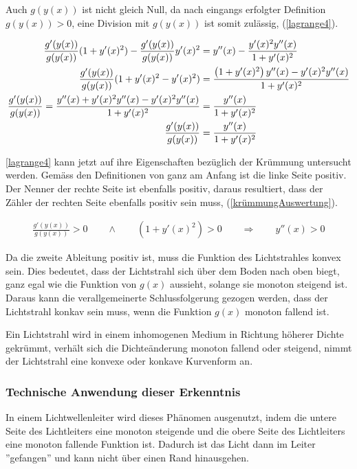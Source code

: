 Auch $g(y(x))$ ist nicht gleich Null, da nach eingangs erfolgter Definition $g(y(x)) > 0$, eine Division mit $g(y(x))$ ist somit zulässig, (\eqref{lagrange4}).

\begin{align}
	\frac{g'(y(x))}{g(y(x))} (1 + y'(x)^2) - \frac{g'(y(x))}{g(y(x))} y'(x)^2 &=  y''(x) - \frac{y'(x)^2 y''(x)}{1 + y'(x)^2} \notag \\
	\frac{g'(y(x))}{g(y(x))} (1 + y'(x)^2 - y'(x)^2) &= \frac{\left(1 + y'(x)^2 \right)y''(x) - y'(x)^2 y''(x)}{1 + y'(x)^2} \notag \\
	\frac{g'(y(x))}{g(y(x))} = \frac{y''(x) + y'(x)^2 y''(x) - y'(x)^2 y''(x)}{1 + y'(x)^2} &= \frac{y''(x)}{1 + y'(x)^2}\notag \\
	\frac{g'(y(x))}{g(y(x))} &= \frac{y''(x)}{1 + y'(x)^2}
	\label{lagrange4}
\end{align}


\eqref{lagrange4} kann jetzt auf ihre Eigenschaften bezüglich der Krümmung untersucht werden. Gemäss den Definitionen von ganz am Anfang ist die linke Seite positiv. 
Der Nenner der rechte Seite ist ebenfalls positiv, daraus resultiert, dass der Zähler der rechten Seite ebenfalls positiv sein muss, (\eqref{krümmungAuswertung}).

\begin{align}
	\frac{g'(y(x))}{g(y(x))} > 0 \qquad \wedge \qquad (1 + y'(x)^2) > 0 \qquad \Rightarrow \qquad y''(x) > 0
	\label{krümmungAuswertung}
\end{align}

Da die zweite Ableitung positiv ist, muss die Funktion des Lichtstrahles konvex sein.
Dies bedeutet, dass der Lichtstrahl sich über dem Boden nach oben biegt, ganz egal wie die Funktion von $g(x)$ aussieht, solange sie monoton steigend ist.
Daraus kann die verallgemeinerte Schlussfolgerung gezogen werden, dass der Lichtstrahl konkav sein muss, wenn die Funktion $g(x)$ monoton fallend ist.
\begin{hilfssatz}
Ein Lichtstrahl wird in einem inhomogenen Medium in Richtung höherer Dichte gekrümmt, verhält sich die Dichteänderung monoton fallend oder steigend, nimmt der Lichtstrahl eine konvexe oder konkave Kurvenform an.
\end{hilfssatz}

\subsubsection{Technische Anwendung dieser Erkenntnis}
In einem Lichtwellenleiter wird dieses Phänomen ausgenutzt, indem die untere Seite des Lichtleiters eine monoton steigende
und die obere Seite des Lichtleiters eine monoton fallende Funktion ist. 
Dadurch ist das Licht dann im Leiter ''gefangen'' und kann nicht über einen Rand hinausgehen.

